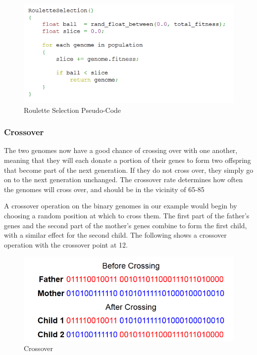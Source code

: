 \documentclass[12pt]{report}
\begin{document}
\begin{figure}[h!]
	\centering
		\includegraphics[scale=1.0]{roulette.png}
	\caption{Roulette Selection Pseudo-Code}
	\label{fig:ID3}
\end{figure}


\subsubsection{Crossover}
The two genomes now have a good chance of crossing over with one another, meaning that they will each donate a portion of their genes to form two offspring that become part of the next generation. If they do not cross over, they simply go on to the next generation unchanged. The crossover rate determines how often the genomes will cross over, and should be in the vicinity of 65-85%

A crossover operation on the binary genomes in our example would begin by choosing a random position at which to cross them. The first part of the father’s genes and the second part of the mother’s genes combine to form the first child, with a similar effect for the second child. The following shows a crossover operation with the crossover point at 12. 

\begin{figure}[h!]
	\centering
		\includegraphics[scale=1.0]{crossover.png}
	\caption{Crossover}
	\label{fig:ID3}
\end{figure}
\end{document}
